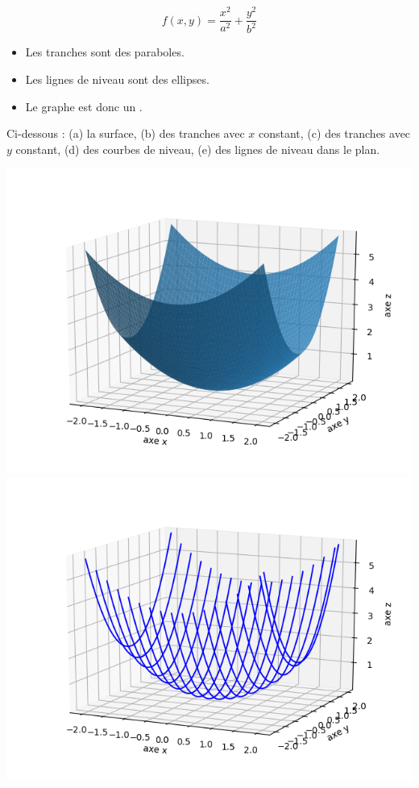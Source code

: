 \documentclass[11pt, class=report,crop=false]{standalone}
\begin{document}
\begin{exemple}
$$f(x,y) = \frac{x^2}{a^2} + \frac{y^2}{b^2}$$

\begin{itemize}
  \item Les tranches sont des paraboles.
  \item Les lignes de niveau sont des ellipses.
  \item Le graphe est donc un .
\end{itemize}

Ci-dessous : (a) la surface, (b) des tranches avec $x$ constant, (c) des tranches avec $y$ constant, (d) des courbes de niveau, (e) des lignes de niveau dans le plan.

\begin{center}
    \includegraphics[scale=\myscale,scale=0.5]{figures/fonctions-quadra-1a}
    \includegraphics[scale=\myscale,scale=0.5]{figures/fonctions-quadra-1b}

\end{center}
\end{exemple}
\end{document}
